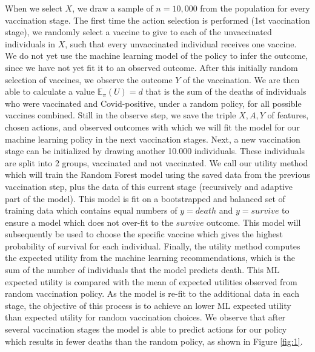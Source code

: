 \documentclass{article}
\begin{document}
When we select $X$, we draw a sample of $n = 10,000$ from the population for every vaccination stage. The first time the action selection is performed (1st vaccination stage), we randomly select a vaccine to give to each of the unvaccinated individuals in $X$, such that every unvaccinated individual receives one vaccine. We do not yet use the machine learning model of the policy to infer the outcome, since we have not yet fit it to an observed outcome. After this initially random selection of vaccines, we observe the outcome $Y$ of the vaccination. We are then able to calculate a value $\mathbb{E}_\pi(U) = d$ that is the sum of the deaths of individuals who were vaccinated and Covid-positive, under a random policy, for all possible vaccines combined. Still in the observe step, we save the triple $X, A, Y$ of features, chosen actions, and observed outcomes with which we will fit the model for our machine learning policy in the next vaccination stages. Next, a new vaccination stage can be initialized by drawing another 10.000 individuals. These individuals are split into 2 groups, vaccinated and not vaccinated. We call our utility method which will train the Random Forest model using the saved data from the previous vaccination step, plus the data of this current stage (recursively and adaptive part of the model). This model is fit on a bootstrapped and balanced set of training data which contains equal numbers of $y = death$ and $y = survive$ to ensure a model which does not over-fit to the $survive$ outcome. This model will subsequently be used to choose the specific vaccine which gives the highest probability of survival for each individual. Finally, the utility method computes the expected utility from the machine learning recommendations, which is the sum of the number of individuals that the model predicts death. This ML expected utility is compared with the mean of expected utilities observed from random vaccination policy. As the model is re-fit to the additional data in each stage, the objective of this process is to achieve an lower ML expected utility than expected utility for random vaccination choices. We observe that after several vaccination stages the model is able to predict actions for our policy which results in fewer deaths than the random policy, as shown in Figure \ref{fig:1}.
\end{document}
